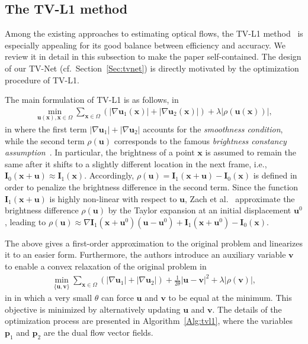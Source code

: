 \documentclass[10pt,twocolumn,letterpaper]{article}
\def\Vec#1{{\boldsymbol{#1}}}
\def\Mat#1{{\boldsymbol{#1}}}
\begin{document}
\subsection{The TV-L1 method}
\label{Sec:tvl1}
Among the existing approaches to estimating  optical flows, the TV-L1 method~\cite{zach2007duality} is especially appealing for its good balance between efficiency and accuracy. We review it in detail in this subsection to make the paper self-contained. The design of our TV-Net (cf.\ Section~\ref{Sec:tvnet}) is directly motivated by the optimization procedure of TV-L1.

The main formulation of TV-L1 is as follows,
 in
\begin{eqnarray}
\label{Eq:energy-function}
\min_{\Mat{u}(\Vec{x}),\Vec{x}\in\Omega} \sum_{\Vec{x}\in \Omega} (|\nabla \Vec{u}_1(\Vec{x})|+|\nabla \Vec{u}_2(\Vec{x})|) + \lambda|\rho(\Vec{u}(\Vec{x}))|,
\end{eqnarray}
 in \noindent
where the first term $|\nabla \Vec{u}_1|+|\nabla \Vec{u}_2|$ accounts for the \emph{smoothness condition}, while the second term $\rho(\Vec{u})$ corresponds to the famous \emph{brightness constancy assumption}~\cite{zach2007duality}. In particular, the brightness of a point $\Vec{x}$ is assumed to remain the same after it shifts to a slightly different location in the next frame, i.e., $\Mat{I}_0(\Vec{x}+\Vec{u})\approx \Mat{I}_{1}(\Vec{x})$. Accordingly, $\rho(\Vec{u})=\Mat{I}_{1}(\Vec{x}+\Vec{u})-\Mat{I}_0(\Vec{x})$ is defined in order to penalize the brightness difference in the second term.
Since the function $\Mat{I}_{1}(\Vec{x}+\Vec{u})$ is highly non-linear with respect to $\Vec{u}$, Zach et al.~\cite{zach2007duality} approximate the brightness difference $\rho(\Vec{u})$ by the Taylor expansion at an initial displacement $\Vec{u}^{0}$,  leading to $\rho(\Vec{u})\approx\nabla\Mat{I}_{1}(\Vec{x}+\Vec{u}^{0})(\Vec{u}-\Vec{u}^{0}) + \Mat{I}_{1}(\Vec{x}+\Vec{u}^0) -\Mat{I}_0(\Vec{x})$.

The above gives a first-order approximation to the original problem and linearizes it to an easier form. Furthermore, the authors introduce an auxiliary variable $\Vec{v}$ to enable a convex relaxation of the original problem
 in
\begin{eqnarray}
\label{Eq:convex-relaxation}
\min_{\{\Mat{u},\Mat{v}\}} \sum_{\Vec{x}\in \Omega} (|\nabla \Vec{u}_1|+|\nabla \Vec{u}_2|) + \frac{1}{2\theta}|\Vec{u}-\Vec{v}|^2 + \lambda|\rho(\Vec{v})|,
\end{eqnarray}
 in \noindent
in which a very small $\theta$ can force $\Vec{u}$ and $\Vec{v}$ to be equal at the minimum. This objective is minimized by alternatively updating $\Vec{u}$ and $\Vec{v}$. The details of the optimization process are presented in Algorithm~\ref{Alg:tvl1}, where the variables $\Vec{p}_1$ and $\Vec{p}_2$ are the dual flow vector fields.
\end{document}
